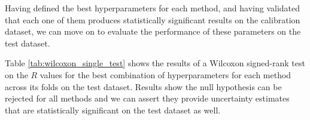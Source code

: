 \documentclass[11pt]{article}
\begin{document}
\begin{table}[h]
    \centering
    \caption{Wilcoxon signed-rank test for calibration dataset}
    \label{tab:wilcoxon_single_calibration}
\end{table}





Having defined the best hyperparameters for each method, and having validated that each one of them produces statistically significant results on the calibration dataset, we can move on to evaluate the performance of these parameters on the test dataset.

Table \ref{tab:wilcoxon_single_test} shows the results of a Wilcoxon signed-rank test on the $R$ values for the best combination of hyperparameters for each method across its folds on the test dataset. Results show the null hypothesis can be rejected for all methods and we can assert they provide uncertainty estimates that are statistically significant on the test dataset as well.

\begin{table}[]
    \centering
    \caption{Wilcoxon signed-rank test for test dataset}
    \label{tab:wilcoxon_single_test}
\end{table}
\end{document}
